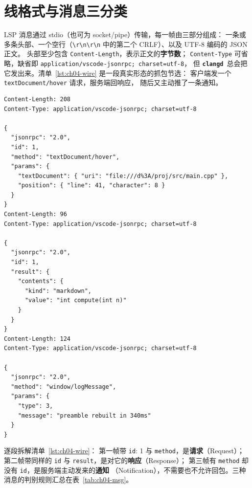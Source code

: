 \documentclass[12pt,a4paper,fontset=fandol]{ctexbook}
\newcommand{\Bk}{\discretionary{}{}{}}
\newcommand{\Lib}[1]{\textbf{\texttt{#1}}}
\newcommand{\CD}{\Lib{clangd}}
\begin{document}
\section{线格式与消息三分类}\label{sec:ch04-s1}

LSP 消息通过 stdio（也可为 socket/pipe）传输，每一帧由三部分组成：
一条或多条头部、一个空行（\texttt{\textbackslash r\textbackslash n\textbackslash r\textbackslash n}
中的第二个 CRLF）、以及 UTF-8 编码的 JSON 正文。
头部至少包含 \texttt{Content-Length}，表示正文的\textbf{字节数}；
\texttt{Content-Type} 可省略，缺省即 \texttt{application/vscode-jsonrpc; charset=utf-8}，
但 \CD\ 总会把它发出来。清单~\ref{lst:ch04-wire} 是一段真实形态的抓包节选：
客户端发一个 \texttt{textDocument/hover}\Bk{} 请求，服务端回响应，
随后又主动推了一条通知。

\begin{lstlisting}[style=jsonstyle,caption={一帧一帧读：请求、响应与通知的原始报文},label={lst:ch04-wire}]
Content-Length: 208
Content-Type: application/vscode-jsonrpc; charset=utf-8

{
  "jsonrpc": "2.0",
  "id": 1,
  "method": "textDocument/hover",
  "params": {
    "textDocument": { "uri": "file:///d%3A/proj/src/main.cpp" },
    "position": { "line": 41, "character": 8 }
  }
}
Content-Length: 96
Content-Type: application/vscode-jsonrpc; charset=utf-8

{
  "jsonrpc": "2.0",
  "id": 1,
  "result": {
    "contents": {
      "kind": "markdown",
      "value": "int compute(int n)"
    }
  }
}
Content-Length: 124
Content-Type: application/vscode-jsonrpc; charset=utf-8

{
  "jsonrpc": "2.0",
  "method": "window/logMessage",
  "params": {
    "type": 3,
    "message": "preamble rebuilt in 340ms"
  }
}
\end{lstlisting}

逐段拆解清单~\ref{lst:ch04-wire}：
第一帧带 \texttt{id}: 1 与 \texttt{method}，是\textbf{请求}（Request）；
第二帧带同样的 \texttt{id} 与 \texttt{result}，是对它的\textbf{响应}（Response）；
第三帧有 \texttt{method} 却没有 \texttt{id}，是服务端主动发来的\textbf{通知}
（Notification），不需要也不允许回包。三种消息的判别规则汇总在表~\ref{tab:ch04-msg}。
\end{document}
